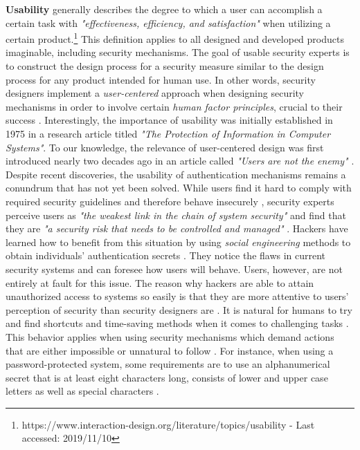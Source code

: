\textbf{Usability} generally describes the degree to which a user can accomplish a certain task with \textit{"effectiveness, efficiency, and satisfaction"} when utilizing a certain product.\footnote{https://www.interaction-design.org/literature/topics/usability - Last accessed: 2019/11/10} This definition applies to all designed and developed products imaginable, including security mechanisms. The goal of usable security experts is to construct the design process for a security measure similar to the design process for any product intended for human use. In other words, security designers implement a \textit{user-centered} approach when designing security mechanisms in order to involve certain \textit{human factor principles}, crucial to their success \cite{Adams:1999:UE:322796.322806, sasse}. Interestingly, the importance of usability was initially established in 1975 in a research article titled \textit{"The Protection of Information in Computer Systems"}. To our knowledge, the relevance of user-centered design was first introduced nearly two decades ago in an article called \textit{"Users are not the enemy"} \cite{Adams:1999:UE:322796.322806}. \\

Despite recent discoveries, the usability of authentication mechanisms remains a conundrum that has not yet been solved. While users find it hard to comply with required security guidelines and therefore behave insecurely \cite{Adams:1999:UE:322796.322806, sasse}, security experts perceive users as \textit{"the weakest link in the chain of system security"} \cite{sasse} and find that they are \textit{"a security risk that needs to be controlled and managed"}  \cite{Adams:1999:UE:322796.322806}. Hackers have learned how to benefit from this situation by using \textit{social engineering} methods to obtain individuals' authentication secrets \cite{Adams:1999:UE:322796.322806, sasse}. They notice the flaws in current security systems and can foresee how users will behave. Users, however, are not entirely at fault for this issue. The reason why hackers are able to attain unauthorized access to systems so easily is that they are more attentive to users' perception of security than security designers are \cite{Adams:1999:UE:322796.322806}. It is natural for humans to try and find shortcuts and time-saving methods when it comes to challenging tasks \cite{sasse}. This behavior applies when using security mechanisms which demand actions that are either impossible or unnatural to follow \cite{sasse}. For instance, when using a password-protected system, some requirements are to use an alphanumerical secret that is at least eight characters long, consists of lower and upper case letters as well as special characters \cite{payne, sasse}. \\


